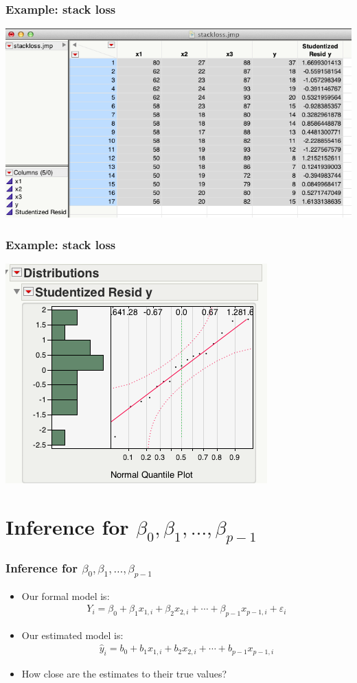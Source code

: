 \documentclass[handout]{beamer}\usepackage[]{graphicx}\usepackage[]{color}
\providecommand{\e}{\varepsilon}
\providecommand{\wh}[1]{\widehat{#1}}
\numberwithin{equation}{section}
\begin{document}
\begin{frame}
\frametitle{Example: stack loss}
 \includegraphics{../../fig/stackstd2.png}
\end{frame}


\begin{frame}
\frametitle{Example: stack loss}
 \includegraphics{../../fig/stackstd3.png}
\end{frame}




\section{Inference for $\beta_0, \beta_1, \ldots, \beta_{p-1}$}

\begin{frame}
\frametitle{Inference for $\beta_0, \beta_1, \ldots, \beta_{p-1}$}
\begin{itemize}
\item Our formal model is:
\begin{align*}
Y_i = \beta_0 + \beta_1 x_{1, i} + \beta_2 x_{2, i} + \cdots + \beta_{p-1} x_{p-1, i} + \e_i
\end{align*}
\pause \item Our estimated model is:
\begin{align*}
\wh{y}_i = b_0 +b_1 x_{1, i} +b_2 x_{2, i} + \cdots + b_{p-1} x_{p-1, i} 
\end{align*}
\pause \item How close are the estimates to their true values?
\end{itemize}
\end{frame}
\end{document}
